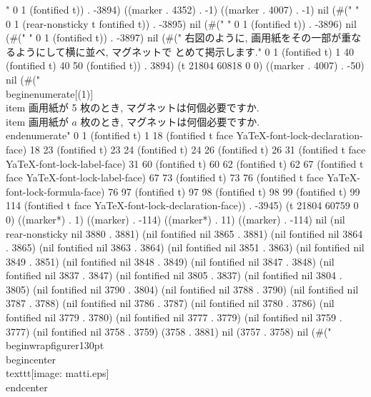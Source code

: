 " 0 1 (fontified t)) . -3894) ((marker . 4352) . -1) ((marker . 4007) . -1) nil (#("
" 0 1 (rear-nonsticky t fontified t)) . -3895) nil (#(" " 0 1 (fontified t)) . -3896) nil (#("
" 0 1 (fontified t)) . -3897) nil (#("
 右図のように, 画用紙をその一部が重なるようにして横に並べ, マグネットで
 とめて掲示します." 0 1 (fontified t) 1 40 (fontified t) 40 50 (fontified t)) . 3894) (t 21804 60818 0 0) ((marker . 4007) . -50) nil (#(" \\begin{enumerate}[(1)]
  \\item 画用紙が 5 枚のとき, マグネットは何個必要ですか.
  \\item 画用紙が $a$ 枚のとき, マグネットは何個必要ですか.
 \\end{enumerate}" 0 1 (fontified t) 1 18 (fontified t face YaTeX-font-lock-declaration-face) 18 23 (fontified t) 23 24 (fontified t) 24 26 (fontified t) 26 31 (fontified t face YaTeX-font-lock-label-face) 31 60 (fontified t) 60 62 (fontified t) 62 67 (fontified t face YaTeX-font-lock-label-face) 67 73 (fontified t) 73 76 (fontified t face YaTeX-font-lock-formula-face) 76 97 (fontified t) 97 98 (fontified t) 98 99 (fontified t) 99 114 (fontified t face YaTeX-font-lock-declaration-face)) . -3945) (t 21804 60759 0 0) ((marker*) . 1) ((marker) . -114) ((marker*) . 11) ((marker) . -114) nil (nil rear-nonsticky nil 3880 . 3881) (nil fontified nil 3865 . 3881) (nil fontified nil 3864 . 3865) (nil fontified nil 3863 . 3864) (nil fontified nil 3851 . 3863) (nil fontified nil 3849 . 3851) (nil fontified nil 3848 . 3849) (nil fontified nil 3847 . 3848) (nil fontified nil 3837 . 3847) (nil fontified nil 3805 . 3837) (nil fontified nil 3804 . 3805) (nil fontified nil 3790 . 3804) (nil fontified nil 3788 . 3790) (nil fontified nil 3787 . 3788) (nil fontified nil 3786 . 3787) (nil fontified nil 3780 . 3786) (nil fontified nil 3779 . 3780) (nil fontified nil 3777 . 3779) (nil fontified nil 3759 . 3777) (nil fontified nil 3758 . 3759) (3758 . 3881) nil (3757 . 3758) nil (#(" \\begin{wrapfigure}{r}{130pt}
  \\begin{center}
   \\texttt{[image: matti.eps]}
  \\end{center}
